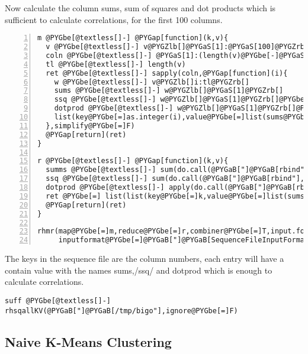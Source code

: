 \documentclass[letterpaper,10pt,english]{manual}
\begin{document}
Now calculate the column sums, sum of squares and dot products which is sufficient to calculate correlations, for the first 100 columns.

\begin{Verbatim}[commandchars=@\[\],numbers=left,firstnumber=1,stepnumber=1]
m @PYGbe[@textless[]-] @PYGap[function](k,v){
  v @PYGbe[@textless[]-] v@PYGZlb[]@PYGaS[1]:@PYGaS[100]@PYGZrb[]
  coln @PYGbe[@textless[]-] @PYGaS[1]:(length(v)@PYGbe[-]@PYGaS[1])
  tl @PYGbe[@textless[]-] length(v)
  ret @PYGbe[@textless[]-] sapply(coln,@PYGap[function](i){
    w @PYGbe[@textless[]-] v@PYGZlb[]i:tl@PYGZrb[]
    sums @PYGbe[@textless[]-] w@PYGZlb[]@PYGaS[1]@PYGZrb[]
    ssq @PYGbe[@textless[]-] w@PYGZlb[]@PYGaS[1]@PYGZrb[]@PYGbe[@textasciicircum[]]@PYGaS[2]
    dotprod @PYGbe[@textless[]-] w@PYGZlb[]@PYGaS[1]@PYGZrb[]@PYGbe[*]w@PYGZlb[]@PYGaS[2]:length(w)@PYGZrb[]
    list(key@PYGbe[=]as.integer(i),value@PYGbe[=]list(sums@PYGbe[=]sums,ssq@PYGbe[=]ssq,dotprod@PYGbe[=]dotprod))
  },simplify@PYGbe[=]F)
  @PYGap[return](ret)
}

r @PYGbe[@textless[]-] @PYGap[function](k,v){
  summs @PYGbe[@textless[]-] sum(do.call(@PYGaB["]@PYGaB[rbind"], lapply(v,@PYGap[function](r) r@$sums)))
  ssq @PYGbe[@textless[]-] sum(do.call(@PYGaB["]@PYGaB[rbind"], lapply(v,@PYGap[function](r) r@$ssq)))
  dotprod @PYGbe[@textless[]-] apply(do.call(@PYGaB["]@PYGaB[rbind"], lapply(v,@PYGap[function](r) r@$dotprod)),@PYGaS[2],sum)
  ret @PYGbe[=] list(list(key@PYGbe[=]k,value@PYGbe[=]list(sums@PYGbe[=]summs,ssq@PYGbe[=]ssq,dotprod@PYGbe[=]dotprod)))
  @PYGap[return](ret)
}

rhmr(map@PYGbe[=]m,reduce@PYGbe[=]r,combiner@PYGbe[=]T,input.folder@PYGbe[=]@PYGaB["]@PYGaB[/tmp/bigd"],output.folder@PYGbe[=]@PYGaB["]@PYGaB[/tmp/bigo"],
     inputformat@PYGbe[=]@PYGaB["]@PYGaB[SequenceFileInputFormat"],outputformat@PYGbe[=]@PYGaB["]@PYGaB[SequenceFileOutputFormat"])
\end{Verbatim}

The keys in the sequence file are the column numbers, each entry will have a contain value with the names sums,/ssq/ and dotprod which is enough to calculate correlations.

\begin{Verbatim}[commandchars=@\[\]]
suff @PYGbe[@textless[]-] rhsqallKV(@PYGaB["]@PYGaB[/tmp/bigo"],ignore@PYGbe[=]F)
\end{Verbatim}


\subsection{Naive K-Means Clustering}
\end{document}
